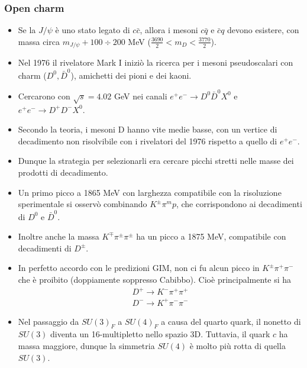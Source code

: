 \subsubsection{Open charm}
\begin{itemize}
    \item Se la $J/\psi$ è uno stato legato di $c\bar c$, allora i mesoni $c\bar q$ e $\bar c q$ devono esistere, con massa circa $m_{J/\psi}+100\div200$ MeV ($\frac{3690}2<m_D<\frac{3770}2$).
    \item Nel 1976 il rivelatore Mark I iniziò la ricerca per i mesoni pseudoscalari con charm ($D^0,\bar D^0$), amichetti dei pioni e dei kaoni. 
    \item Cercarono con $\sqrt s=4.02$ GeV nei canali $e^+e^-\to D^0\bar D^0X^0$ e $e^+e^-\to D^+D^-X^0$.
    \item Secondo la teoria, i mesoni D hanno vite medie basse, con un vertice di decadimento non risolvibile con i rivelatori del 1976 rispetto a quello di $e^+e^-$.
    \item Dunque la strategia per selezionarli era cercare picchi stretti nelle masse dei prodotti di decadimento. 
    \item Un primo picco a 1865 MeV con larghezza compatibile con la risoluzione sperimentale si osservò combinando $K^\pm\pi^mp$, che corrispondono ai decadimenti di $D^0$ e $\bar D^0$.
    \item Inoltre anche la massa $K^\mp\pi^\pm\pi^\pm$ ha un picco a 1875 MeV, compatibile con decadimenti di $D^\pm$. 
    \item In perfetto accordo con le predizioni GIM, non ci fu alcun picco in $K^\pm\pi^+\pi^-$ che è proibito (doppiamente soppresso Cabibbo). Cioè principalmente si ha 
    \begin{gather*}
    D^+\to K^-\pi^+\pi^+\\
    D^-\to K^+\pi^-\pi^-
    \end{gather*}
    \item Nel passaggio da $SU(3)_F$ a $SU(4)_F$ a causa del quarto quark, il nonetto di $SU(3)$ diventa un 16-multipletto nello spazio 3D. Tuttavia, il quark $c$ ha massa maggiore, dunque la simmetria $SU(4)$ è molto più rotta di quella $SU(3)$.
\end{itemize}
